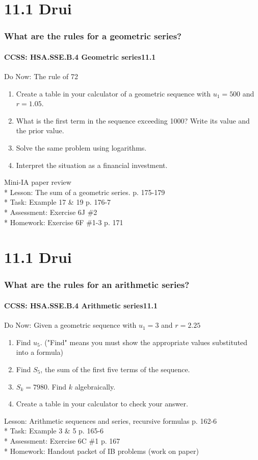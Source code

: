 \documentclass{beamer}
\begin{document}
  \section{11.1 Drui}
  \frame
  {
    \frametitle{What are the rules for a geometric series?}
    \framesubtitle{CCSS: HSA.SSE.B.4 Geometric series\qquad \alert{11.1}}

    \begin{block}{Do Now: The rule of 72}
    \begin{enumerate}
        \item Create a table in your calculator of a geometric sequence with $u_1=500$ and $r=1.05$.
        \item What is the first term in the sequence exceeding 1000? Write its value and the prior value.
        \item Solve the same problem using logarithms.
        \item Interpret the situation as a financial investment.
    \end{enumerate}
    \end{block}
    Mini-IA paper review\\*
    Lesson: The sum of a geometric series. p. 175-179\\*
    Task: Example 17 \& 19 p. 176-7\\*
    Assessment: Exercise 6J \#2\\*
    Homework: Exercise 6F \#1-3 p. 171
  }


  \section{11.1 Drui}
  \frame
  {
    \frametitle{What are the rules for an arithmetic series?}
    \framesubtitle{CCSS: HSA.SSE.B.4 Arithmetic series\qquad \alert{11.1}}

    \begin{block}{Do Now: Given a geometric sequence with $u_1=3$ and $r=2.25$}
    \begin{enumerate}
        \item Find $u_5$. ("Find" means you must show the appropriate values substituted into a formula)
        \item Find $S_5$, the sum of the first five terms of the sequence.
        \item $S_k=7980$. Find $k$ algebraically.
        \item Create a table in your calculator to check your answer.
    \end{enumerate}
    \end{block}
    Lesson: Arithmetic sequences and series, recursive formulas p. 162-6\\*
    Task: Example 3 \& 5 p. 165-6\\*
    Assessment: Exercise 6C \#1 p. 167\\*
    Homework: Handout packet of IB problems (work on paper)
  }
\end{document}
